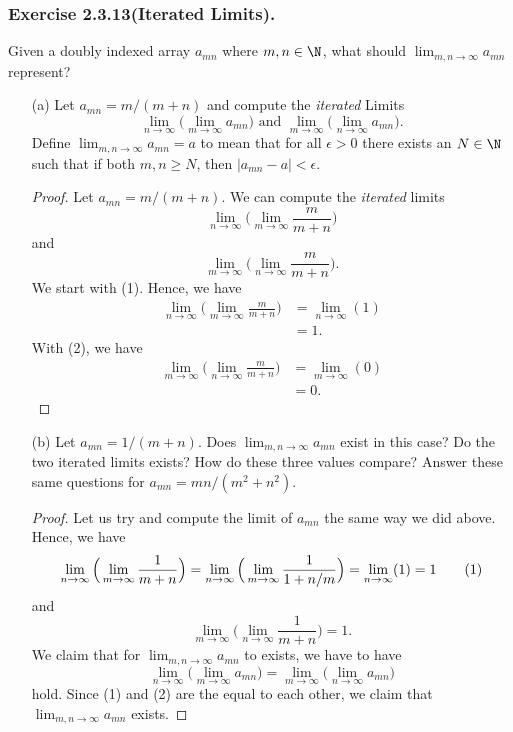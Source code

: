 \subsubsection{Exercise 2.3.13(Iterated Limits).} Given a doubly indexed array \( a_{mn}\) where \( m, n \in \N \), what should \(\lim_{m,n \to \infty} a_{mn}\) represent?  

\begin{enumerate}
    \item[(a)] Let \( a_{mn} = m / (m+n)\)  and compute the \textit{iterated} Limits
        \[ \lim_{n \to \infty } \Big( \lim_{m \to \infty} a_{mn} \Big) \text{ and } \lim_{m \to \infty } \Big( \lim_{n \to \infty} a_{mn} \Big).\]
        Define \(\lim_{m,n \to \infty} a_{mn} = a \) to mean that for all \( \epsilon > 0 \) there exists an \( N \in \N \) such that if both \( m,n \geq N \), then \( |a_{mn} - a | < \epsilon \).
        \begin{proof}
        Let \( a_{mn} = m / (m+n)\). We can compute the \textit{iterated} limits 
        \[  \lim_{n \to \infty} \Big( \lim_{m \to \infty} \frac{m}{m+n}\Big) \tag{1}  \]
        and
        \[ \lim_{m \to \infty} \Big( \lim_{n \to \infty} \frac{m}{m+n}\Big). \tag{2}\]
        We start with (1). Hence, we have 
        \begin{align*}
            \lim_{n \to \infty } \Big( \lim_{ m \to \infty} \frac{m}{m+n}\Big)  &= \lim_{ n \to \infty} (1)  \\
                                                                                &= 1.
        \end{align*}
        With (2), we have 
        \begin{align*}
            \lim_{m \to \infty} \Big( \lim_{ n \to \infty} \frac{m}{m+n}\Big)&= \lim_{m \to \infty} (0) \\
                                                                             &= 0. 
        \end{align*}

        \end{proof}
    \item[(b)] Let \( a_{mn} = 1/(m+n)\). Does \( \lim_{m,n \to \infty} a_{mn} \) exist in this case? Do the two iterated limits exists? How do these three values compare? Answer these same questions for \( a_{mn} = mn / (m^2 + n^2 )\). 
        \begin{proof}
            Let us try and compute the limit of \( a_{mn} \) the same way we did above. Hence, we have 
            \[
                \lim_{n \to \infty} \Big( \lim_{m \to \infty} \frac{1}{m+n} \Big)= \lim_{n \to \infty} \Big( \lim_{ m \to \infty} \frac{1}{1 + n/m}\Big)= \lim_{ n \to \infty} (1) = 1 \tag{1}\\
            \]
            and 
            \[ \lim_{m \to \infty} \Big( \lim_{n \to \infty} \frac{1}{m+n} \Big) = 1. \tag{2}\]
            We claim that for \( \lim_{m,n \to  \infty} a_{mn}\) to exists, we have to have 
            \[ \lim_{n \to \infty} \Big( \lim_{m \to \infty} a_{mn}\Big) = \lim_{m \to \infty} \Big( \lim_{n \to \infty} a_{mn}\Big) \]
            hold. Since (1) and (2) are the equal to each other, we claim that \( \lim_{m,n \to  \infty} a_{mn}\) exists. 


\end{proof}
\end{enumerate}
